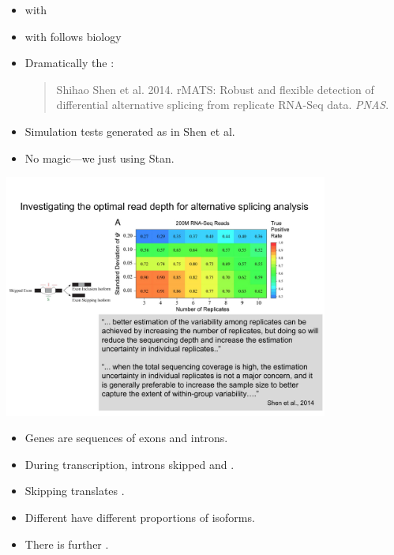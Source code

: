 \documentclass[10pt]{report}
\begin{document}
\begin{itemize}
\item {} with
\item {} with  follows biology
\item Dramatically  the :
\begin{quote}
\footnotesize Shihao Shen et al. 2014. rMATS: Robust and flexible detection of
differential alternative splicing from replicate RNA-Seq data.
{\slshape PNAS}.
\end{quote}
\item Simulation tests generated as in Shen et al.
\item No magic---we just  using Stan.
\end{itemize}

\begin{center}
\includegraphics[width=0.8\textwidth]{img/cassette-exon.pdf}
\end{center}
\begin{itemize}
\item Genes are sequences of exons and introns.
\item During transcription, introns skipped and .
\item Skipping  translates .
\item Different  have different proportions of isoforms.
\item There is further .
\end{itemize}
\end{document}
